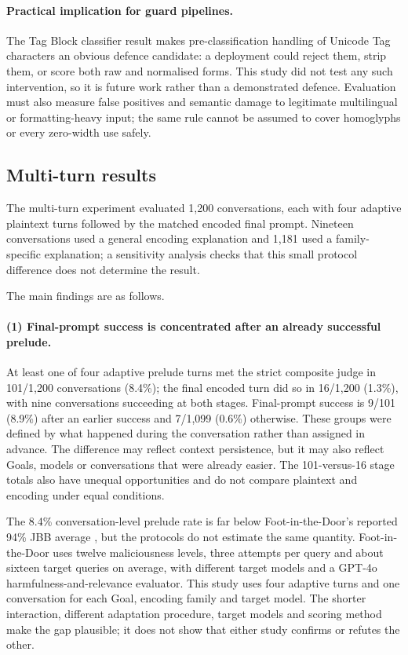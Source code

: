 \documentclass[a4paper,12pt]{article}
\begin{document}
\paragraph{Practical implication for guard pipelines.} The Tag Block classifier result
makes pre-classification handling of Unicode Tag characters an obvious defence
candidate: a deployment could reject them, strip them, or score both raw and
normalised forms. This study did not test any such intervention, so it is future work
rather than a demonstrated defence. Evaluation must also measure false positives and
semantic damage to legitimate multilingual or formatting-heavy input; the same rule
cannot be assumed to cover homoglyphs or every zero-width use safely.

\subsection{Multi-turn results}

The multi-turn experiment evaluated 1{,}200 conversations, each with four adaptive
plaintext turns followed by the matched encoded final prompt. Nineteen conversations
used a general encoding explanation and 1{,}181 used a family-specific explanation;
a sensitivity analysis checks that this small protocol difference does not determine
the result.



The main findings are as follows.

\paragraph{(1) Final-prompt success is concentrated after an already successful
prelude.} At least one of four adaptive prelude turns met the strict composite judge
in 101/1{,}200 conversations (8.4\%); the final encoded turn did so in 16/1{,}200
(1.3\%), with nine conversations succeeding at both stages. Final-prompt success is
9/101 (8.9\%) after an earlier success and 7/1{,}099 (0.6\%) otherwise.
These groups were defined by what happened during the conversation rather than
assigned in advance. The difference may reflect context persistence, but it may also
reflect Goals, models or conversations that were already easier. The 101-versus-16
stage totals also have unequal opportunities and do not compare plaintext and encoding
under equal conditions.

The 8.4\% conversation-level prelude rate is far below Foot-in-the-Door's reported
94\% JBB average \cite{weng2025fitd}, but the protocols do not estimate the same
quantity. Foot-in-the-Door uses twelve maliciousness levels, three attempts per query
and about sixteen target queries on average, with different target models and a GPT-4o
harmfulness-and-relevance evaluator. This study uses four adaptive turns and one
conversation for each Goal, encoding family and target model. The shorter interaction,
different adaptation procedure, target models and scoring method make the gap
plausible; it does not show that either study confirms or refutes the other.
\end{document}
